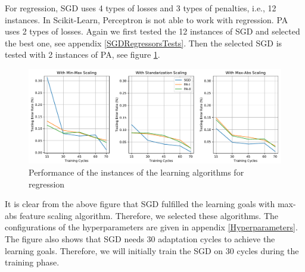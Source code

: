 \documentclass[a4paper,12pt]{article}
\begin{document}
For regression, SGD uses 4 types of losses and 3 types of penalties, i.e., 12 instances. In Scikit-Learn, Perceptron is not able to work with regression. PA uses 2 types of losses. Again we first tested the 12 instances of SGD and selected the best one, see appendix \ref{SGDRegressorsTests}. Then the selected SGD is tested with 2 instances of PA, see figure \ref{Regressors}. 
\begin{figure}[H]
    \centering
    \includegraphics[keepaspectratio, width=\linewidth]{graphs/RegressionModelSelection.pdf}
    \caption{Performance of the instances of the learning algorithms for regression}
    \label{Regressors}
\end{figure}
It is clear from the above figure that SGD fulfilled the learning goals with max-abs feature scaling algorithm. Therefore, we selected these algorithms. The configurations of the hyperparameters are given in appendix \ref{Hyperparameters}. The figure also shows that SGD needs 30 adaptation cycles to achieve the learning goals. Therefore, we will initially train the SGD on 30 cycles during the training phase.
\end{document}
